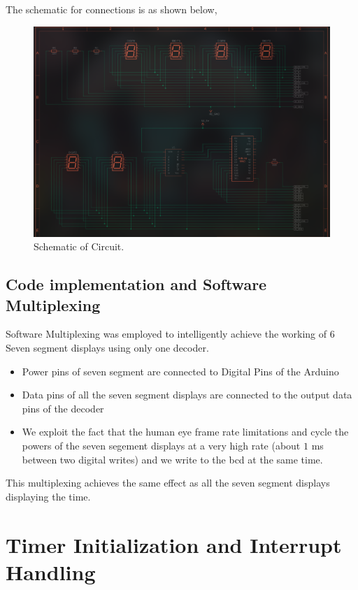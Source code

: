 \documentclass[a4paper,12pt]{article}
\begin{document}
The schematic for connections is as shown below,
\begin{figure}[H]
    \centering
    \includegraphics[width=\textwidth]{./figs/circuit_schematic.png}
    \caption{Schematic of Circuit.}
    \label{fig:circuit_schematic}
\end{figure}

\subsection*{Code implementation and Software Multiplexing}
Software Multiplexing was employed to intelligently achieve the working of 6 Seven segment displays using only one decoder.
\begin{itemize}
    \item Power pins of seven segment are connected to Digital Pins of the Arduino
    \item Data pins of all the seven segment displays are connected to the output data pins of the decoder
    \item We exploit the fact that the human eye frame rate limitations and cycle the powers of the seven segement displays at a very high rate (about $1$ ms between two digital writes) and we write to the bcd at the same time.
\end{itemize}
This multiplexing achieves the same effect as all the seven segment displays displaying the time.

\section*{Timer Initialization and Interrupt Handling}
\end{document}
